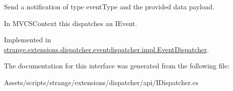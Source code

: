 Send a notification of type event\-Type and the provided data payload. 

In M\-V\-C\-S\-Context this dispatches an I\-Event. 

Implemented in \hyperlink{classstrange_1_1extensions_1_1dispatcher_1_1eventdispatcher_1_1impl_1_1_event_dispatcher_a14124806e6632e75aa0ff0c02d23483b}{strange.\-extensions.\-dispatcher.\-eventdispatcher.\-impl.\-Event\-Dispatcher}.



The documentation for this interface was generated from the following file\-:\begin{DoxyCompactItemize}
\item 
Assets/scripts/strange/extensions/dispatcher/api/I\-Dispatcher.\-cs\end{DoxyCompactItemize}
